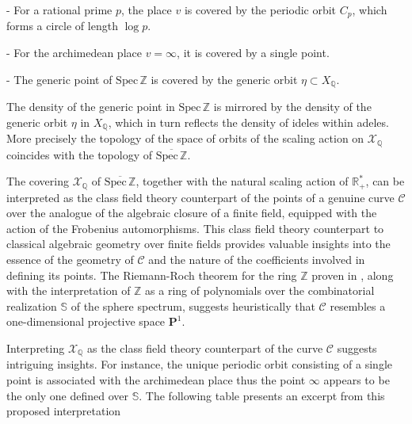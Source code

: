 \documentclass[letterpaper,11pt]{article}
\def\Q{{\mathbb Q}}
\def\Z{\mathbb{Z}}
\theoremstyle{plain}
\begin{document}
- For a rational prime $ p $, the place $ v $ is covered by the periodic orbit $ C_p $, which forms a circle of length $ \log p $.  \vspace{.01in}

- For the archimedean place $ v = \infty $, it is covered by a single point.\vspace{.01in}

- The generic point of $ \text{Spec} \, \mathbb{Z} $ is covered by the generic orbit $ \eta\subset X_\Q$.  \vspace{.03in}

The density of the generic point in $ \text{Spec} \, \mathbb{Z} $ is mirrored by the density of the generic orbit $ \eta $ in $ X_\mathbb{Q} $, which in turn reflects the density of ideles within adeles. More precisely the topology of the space of orbits of the scaling action on $ \mathcal{X}_\mathbb{Q} $ coincides with the topology of $ \overline{\text{Spec} \, \mathbb{Z}} $.\vspace{.02in} 

The covering $ \mathcal{X}_\mathbb{Q} $ of $ \overline{\text{Spec} \, \mathbb{Z}} $, together with the natural scaling action of $ \mathbb{R}_+^* $, can be interpreted as the class field theory counterpart of the points of a genuine  curve $\mathscr C$  over  the analogue of the algebraic closure of a finite field, equipped with the action of the Frobenius automorphisms. This class field theory counterpart to classical algebraic geometry over finite fields provides valuable insights into the essence of the geometry of $ \mathscr{C} $ and the nature of the coefficients involved in defining its points. The Riemann-Roch theorem for the ring $\Z$ proven in \cite{CC6,CC7}, along with the interpretation of $\mathbb{Z}$ as a ring of polynomials  over the combinatorial realization $\mathbb{S}$ of the sphere spectrum, suggests heuristically that $\mathscr{C}$ resembles a one-dimensional projective space $\mathbf{P}^1$. 






Interpreting $\mathcal{X}_\mathbb{Q}$ as the class field theory counterpart of the curve $\mathscr C$  suggests  intriguing insights. For instance, the unique periodic orbit consisting of a single point is associated with the archimedean place  thus the point $\infty$ appears to be the only one defined over $\mathbb{S}$. The following table presents an excerpt from this proposed interpretation
\end{document}
